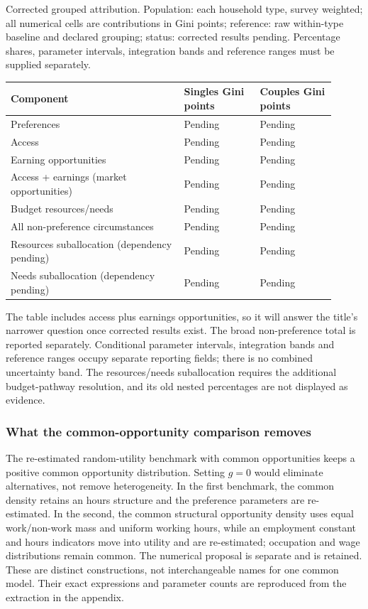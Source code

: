 \documentclass[11pt,a4paper]{article}
\begin{document}
Corrected grouped attribution. Population: each household type, survey weighted; all numerical cells are contributions in Gini points; reference: raw within-type baseline and declared grouping; status: corrected results pending. Percentage shares, parameter intervals, integration bands and reference ranges must be supplied separately.

{ %
\small\setlength{\tabcolsep}{3pt}\begin{longtable}[]{@{}>{\raggedright\arraybackslash}p{0.4800\linewidth}>{\raggedright\arraybackslash}p{0.2150\linewidth}>{\raggedright\arraybackslash}p{0.2150\linewidth}@{}}
\toprule\noalign{}
Component & Singles Gini points & Couples Gini points \\
\midrule\noalign{}
\endhead
\bottomrule\noalign{}
\endlastfoot
Preferences & Pending & Pending \\
Access & Pending & Pending \\
Earning opportunities & Pending & Pending \\
Access + earnings (market opportunities) & Pending & Pending \\
Budget resources/needs & Pending & Pending \\
All non-preference circumstances & Pending & Pending \\
Resources suballocation (dependency pending) & Pending & Pending \\
Needs suballocation (dependency pending) & Pending & Pending \\
\end{longtable}
}

The table includes access plus earnings opportunities, so it will answer the title's narrower question once corrected results exist. The broad non-preference total is reported separately. Conditional parameter intervals, integration bands and reference ranges occupy separate reporting fields; there is no combined uncertainty band. The resources/needs suballocation requires the additional budget-pathway resolution, and its old nested percentages are not displayed as evidence.

\subsubsection{What the common-opportunity comparison removes}\label{what-the-common-opportunity-comparison-removes}

The re-estimated random-utility benchmark with common opportunities keeps a positive common opportunity distribution. Setting \(g=0\) would eliminate alternatives, not remove heterogeneity. In the first benchmark, the common density retains an hours structure and the preference parameters are re-estimated. In the second, the common structural opportunity density uses equal work/non-work mass and uniform working hours, while an employment constant and hours indicators move into utility and are re-estimated; occupation and wage distributions remain common. The numerical proposal is separate and is retained. These are distinct constructions, not interchangeable names for one common model. Their exact expressions and parameter counts are reproduced from the extraction in the appendix.
\end{document}
